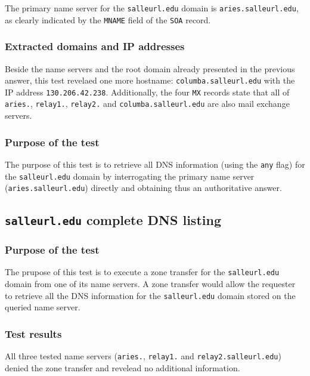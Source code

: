 The primary name server for the {\tt salleurl.edu} domain is {\tt aries.salleurl.edu}, as clearly indicated by the {\tt MNAME} field of the {\tt SOA} record.

\subsubsection{Extracted domains and IP addresses}

Beside the name servers and the root domain already presented in the previous answer, this test revelaed one more hostname: {\tt columba.salleurl.edu} with the IP address {\tt 130.206.42.238}. Additionally, the four {\tt MX} records state that all of {\tt aries.}, {\tt relay1.}, {\tt relay2.} and {\tt columba.salleurl.edu} are also mail exchange servers.

\subsubsection{Purpose of the test}

The purpose of this test is to retrieve all DNS information (using the {\tt any} flag) for the {\tt salleurl.edu} domain by interrogating the primary name server ({\tt aries.salleurl.edu}) directly and obtaining thus an authoritative answer.



\subsection{\texttt{salleurl.edu} complete DNS listing}

\subsubsection{Purpose of the test}

The prupose of this test is to execute a zone transfer for the {\tt salleurl.edu} domain from one of its name servers. A zone transfer would allow the requester to retrieve all the DNS information for the {\tt salleurl.edu} domain stored on the queried name server.

\subsubsection{Test results}

All three tested name servers ({\tt aries.}, {\tt relay1.} and {\tt relay2.salleurl.edu}) denied the zone transfer and revelead no additional information.
